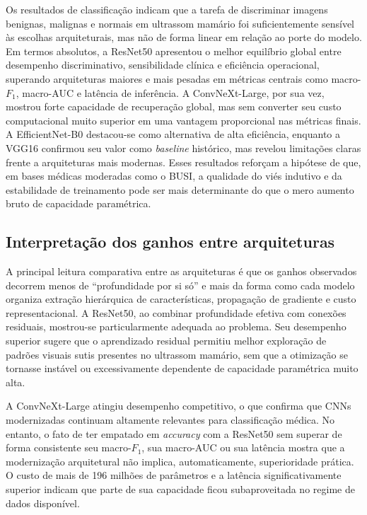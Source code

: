 \documentclass[tcc,capa]{texufpel}
\begin{document}
Os resultados de classificação indicam que a tarefa de discriminar imagens benignas, malignas e normais em ultrassom mamário foi suficientemente sensível às escolhas arquiteturais, mas não de forma linear em relação ao porte do modelo. Em termos absolutos, a ResNet50 apresentou o melhor equilíbrio global entre desempenho discriminativo, sensibilidade clínica e eficiência operacional, superando arquiteturas maiores e mais pesadas em métricas centrais como macro-\(F_1\), macro-AUC e latência de inferência. A ConvNeXt-Large, por sua vez, mostrou forte capacidade de recuperação global, mas sem converter seu custo computacional muito superior em uma vantagem proporcional nas métricas finais. A EfficientNet-B0 destacou-se como alternativa de alta eficiência, enquanto a VGG16 confirmou seu valor como \textit{baseline} histórico, mas revelou limitações claras frente a arquiteturas mais modernas. Esses resultados reforçam a hipótese de que, em bases médicas moderadas como o BUSI, a qualidade do viés indutivo e da estabilidade de treinamento pode ser mais determinante do que o mero aumento bruto de capacidade paramétrica.

\subsection{Interpretação dos ganhos entre arquiteturas}

A principal leitura comparativa entre as arquiteturas é que os ganhos observados decorrem menos de ``profundidade por si só'' e mais da forma como cada modelo organiza extração hierárquica de características, propagação de gradiente e custo representacional. A ResNet50, ao combinar profundidade efetiva com conexões residuais, mostrou-se particularmente adequada ao problema. Seu desempenho superior sugere que o aprendizado residual permitiu melhor exploração de padrões visuais sutis presentes no ultrassom mamário, sem que a otimização se tornasse instável ou excessivamente dependente de capacidade paramétrica muito alta.

A ConvNeXt-Large atingiu desempenho competitivo, o que confirma que CNNs modernizadas continuam altamente relevantes para classificação médica. No entanto, o fato de ter empatado em \textit{accuracy} com a ResNet50 sem superar de forma consistente seu macro-\(F_1\), sua macro-AUC ou sua latência mostra que a modernização arquitetural não implica, automaticamente, superioridade prática. O custo de mais de 196 milhões de parâmetros e a latência significativamente superior indicam que parte de sua capacidade ficou subaproveitada no regime de dados disponível.
\end{document}
